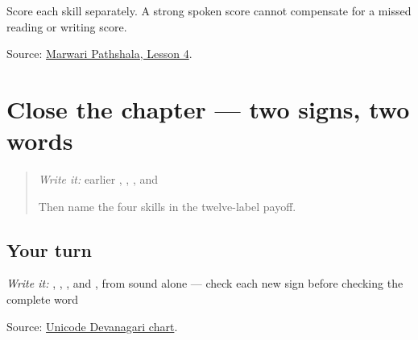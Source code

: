 Score each skill separately. A strong spoken score cannot compensate for a missed reading or writing score.

\begin{tcolorbox}[breakable,colback=teal!4,colframe=teal!35!black,title={Before you move on}]
Source: \href{https://www.marwaripathshala.com/marwari-lesson-4-english}{Marwari Pathshala, Lesson 4}.
\end{tcolorbox}
\section[Practice]{Close the chapter — two signs, two words}

\label{lesson:MW-R09-script-close}



\begin{quote}
\emph{Write it:} earlier \textbf{}, \textbf{}, \textbf{}, and \textbf{}

Then name the four skills in the twelve-label payoff.
\end{quote}

\subsection*{Your turn}
\emph{Write it:} \textbf{}, \textbf{}, \textbf{}, and \textbf{}, from sound alone — check each new sign before checking the complete word

\begin{tcolorbox}[breakable,colback=teal!4,colframe=teal!35!black,title={Before you move on}]
Source: \href{https://www.unicode.org/charts/PDF/U0900.pdf}{Unicode Devanagari chart}.
\end{tcolorbox}
